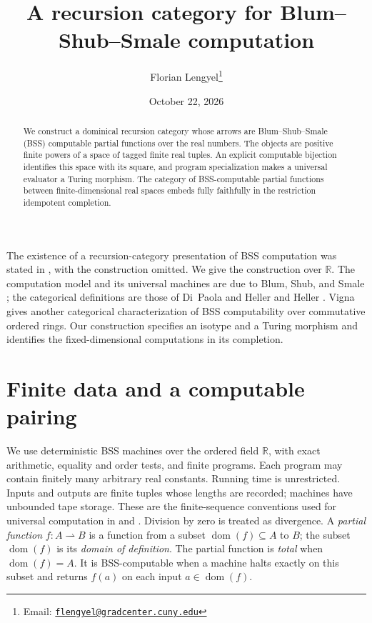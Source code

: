 \documentclass[11pt]{article}
\title{A recursion category for Blum--Shub--Smale computation}
\author{Florian Lengyel\thanks{Email:
\href{mailto:flengyel@gradcenter.cuny.edu}{\texttt{flengyel@gradcenter.cuny.edu}}}}
\date{October 22, 2026}
\newcommand{\R}{\mathbb R}
\newcommand{\pfn}{\rightharpoonup}
\newcommand{\dom}{\operatorname{dom}}
\begin{document}
\maketitle
\begin{abstract}
We construct a dominical recursion category whose arrows are
Blum--Shub--Smale (BSS) computable partial functions over the real numbers.
The objects are positive finite powers of a space of tagged finite real
tuples. An explicit computable bijection identifies this space with its
square, and program specialization makes a universal evaluator a Turing
morphism. The category of BSS-computable partial functions between
finite-dimensional real spaces embeds fully faithfully in the restriction
idempotent completion.
\end{abstract}

The existence of a recursion-category presentation of BSS computation
was stated in \cite[\S3, p.~25]{Lengyel01}, with the construction omitted.
We give the construction over $\R$. The computation model and its
universal machines are due to Blum, Shub, and Smale
\cite{BSS89,BCSS98}; the categorical definitions are those of Di~Paola
and Heller \cite{DPH87} and Heller \cite{Heller90}.
Vigna \cite{Vigna96} gives another categorical characterization of
BSS computability over commutative ordered rings.
Our construction specifies an isotype and a Turing morphism and
identifies the fixed-dimensional computations in its completion.

\section{Finite data and a computable pairing}
\label{sec:data}

We use deterministic BSS machines over the ordered field $\R$, with
exact arithmetic, equality and order tests, and finite programs.
Each program may contain finitely many arbitrary real constants.
Running time is unrestricted. Inputs and outputs are finite tuples
whose lengths are recorded; machines have unbounded tape storage.
These are the finite-sequence conventions used for universal
computation in \cite[\S8]{BSS89} and \cite[Chapter~3]{BCSS98}.
Division by zero is treated as divergence. A \emph{partial function}
$f:A\pfn B$ is a function from a subset $\dom(f)\subseteq A$ to $B$;
the subset $\dom(f)$ is its \emph{domain of definition}.
The partial function is \emph{total} when $\dom(f)=A$.
It is BSS-computable when a machine halts exactly on this subset
and returns $f(a)$ on each input $a\in\dom(f)$.
\end{document}
